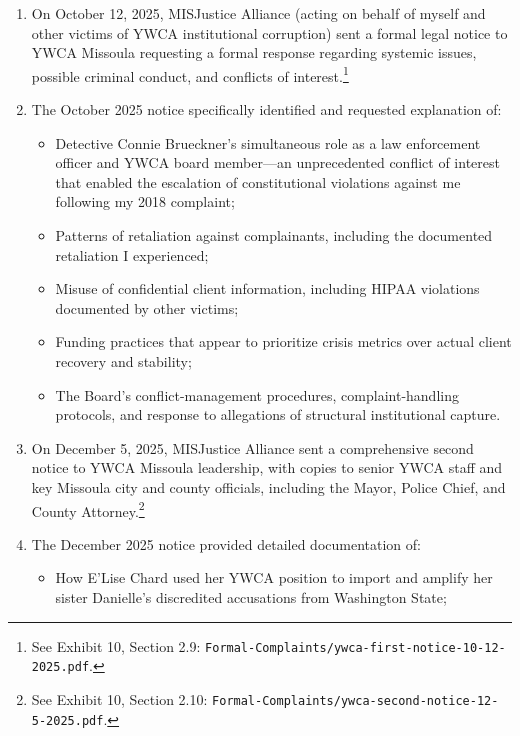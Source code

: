 \documentclass[12pt,letterpaper]{article}
\begin{document}
\begin{enumerate}

\item On October 12, 2025, MISJustice Alliance (acting on behalf of myself and other victims of YWCA institutional corruption) sent a formal legal notice to YWCA Missoula requesting a formal response regarding systemic issues, possible criminal conduct, and conflicts of interest.\footnote{See Exhibit 10, Section 2.9: \texttt{Formal-Complaints/ywca-first-notice-10-12-2025.pdf}.}

\item The October 2025 notice specifically identified and requested explanation of:

\begin{itemize}
\item Detective Connie Brueckner's simultaneous role as a law enforcement officer and YWCA board member---an unprecedented conflict of interest that enabled the escalation of constitutional violations against me following my 2018 complaint;

\item Patterns of retaliation against complainants, including the documented retaliation I experienced;

\item Misuse of confidential client information, including HIPAA violations documented by other victims;

\item Funding practices that appear to prioritize crisis metrics over actual client recovery and stability;

\item The Board's conflict-management procedures, complaint-handling protocols, and response to allegations of structural institutional capture.
\end{itemize}

\item On December 5, 2025, MISJustice Alliance sent a comprehensive second notice to YWCA Missoula leadership, with copies to senior YWCA staff and key Missoula city and county officials, including the Mayor, Police Chief, and County Attorney.\footnote{See Exhibit 10, Section 2.10: \texttt{Formal-Complaints/ywca-second-notice-12-5-2025.pdf}.}

\item The December 2025 notice provided detailed documentation of:

\begin{itemize}
\item How E'Lise Chard used her YWCA position to import and amplify her sister Danielle's discredited accusations from Washington State;


\end{itemize}
\end{enumerate}
\end{document}
